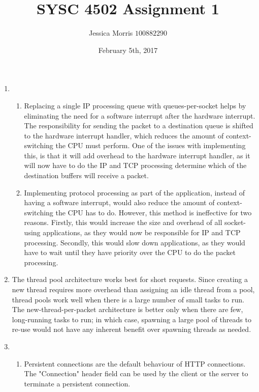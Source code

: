 \documentclass{article}
\title{SYSC 4502 Assignment 1}
\date{February 5th, 2017}
\author{Jessica Morris \(100882290\)}
\begin{document}
\maketitle

\begin{enumerate}

\item
\begin{enumerate}

\item Replacing a single IP processing queue with queues-per-socket helps by eliminating the need for a software interrupt after the hardware interrupt. The responsibility for sending the packet to a destination queue is shifted to the hardware interrupt handler, which reduces the amount of context-switching the CPU must perform. One of the issues with implementing this, is that it will add overhead to the hardware interrupt handler, as it will now have to do the IP and TCP processing determine which of the destination buffers will receive a packet.

\item Implementing protocol processing as part of the application, instead of having a software interrupt, would also reduce the amount of context-switching the CPU has to do. However, this method is ineffective for two reasons. Firstly, this would increase the size and overhead of all socket-using applications, as they would now be responsible for IP and TCP processing. Secondly, this would slow down applications, as they would have to wait until they have priority over the CPU to do the packet processing.

\end{enumerate}

\item The thread pool architecture works best for short requests. Since creating a new thread requires more overhead than assigning an idle thread from a pool, thread pools work well when there is a large number of small tasks to run. The new-thread-per-packet architecture is better only when there are few, long-running tasks to run; in which case, spawning a large pool of threads to re-use would not have any inherent benefit over spawning threads as needed.

\item
\begin{enumerate}

\item Persistent connections are the default behaviour of HTTP connections. The "Connection" header field can be used by the client or the server to terminate a persistent connection.


\end{enumerate}
\end{enumerate}
\end{document}
